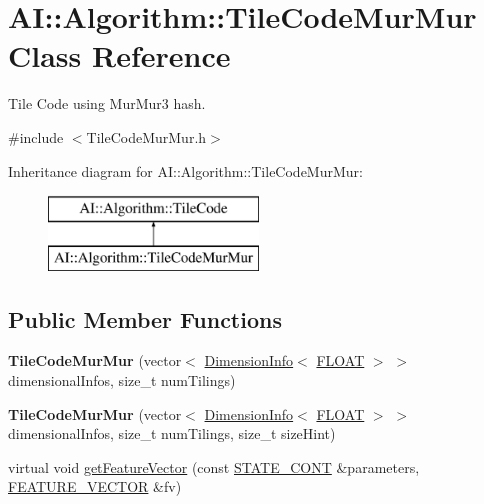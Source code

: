 \hypertarget{classAI_1_1Algorithm_1_1TileCodeMurMur}{\section{A\+I\+:\+:Algorithm\+:\+:Tile\+Code\+Mur\+Mur Class Reference}
\label{classAI_1_1Algorithm_1_1TileCodeMurMur}
}


Tile Code using Mur\+Mur3 hash.  




{\ttfamily \#include $<$Tile\+Code\+Mur\+Mur.\+h$>$}

Inheritance diagram for A\+I\+:\+:Algorithm\+:\+:Tile\+Code\+Mur\+Mur\+:\begin{figure}[H]
\begin{center}
\leavevmode
\includegraphics[height=2.000000cm]{classAI_1_1Algorithm_1_1TileCodeMurMur}
\end{center}
\end{figure}
\subsection*{Public Member Functions}
\begin{DoxyCompactItemize}
\item 
\hypertarget{classAI_1_1Algorithm_1_1TileCodeMurMur_a48746c4faa0e887b4a1fb16aba0cd6d9}{{\bfseries Tile\+Code\+Mur\+Mur} (vector$<$ \hyperlink{classAI_1_1Algorithm_1_1DimensionInfo}{Dimension\+Info}$<$ \hyperlink{namespaceAI_a41b74884a20833db653dded3918e05c3}{F\+L\+O\+A\+T} $>$ $>$ dimensional\+Infos, size\+\_\+t num\+Tilings)}\label{classAI_1_1Algorithm_1_1TileCodeMurMur_a48746c4faa0e887b4a1fb16aba0cd6d9}

\item 
\hypertarget{classAI_1_1Algorithm_1_1TileCodeMurMur_a55c39ff49b9686a90ed6f823986fe4c3}{{\bfseries Tile\+Code\+Mur\+Mur} (vector$<$ \hyperlink{classAI_1_1Algorithm_1_1DimensionInfo}{Dimension\+Info}$<$ \hyperlink{namespaceAI_a41b74884a20833db653dded3918e05c3}{F\+L\+O\+A\+T} $>$ $>$ dimensional\+Infos, size\+\_\+t num\+Tilings, size\+\_\+t size\+Hint)}\label{classAI_1_1Algorithm_1_1TileCodeMurMur_a55c39ff49b9686a90ed6f823986fe4c3}

\item 
virtual void \hyperlink{classAI_1_1Algorithm_1_1TileCodeMurMur_abd19bfe7dd3ddace0cec0ad9a8715392}{get\+Feature\+Vector} (const \hyperlink{namespaceAI_aff63ec21d97dd5f086fddbc3103f5707}{S\+T\+A\+T\+E\+\_\+\+C\+O\+N\+T} \&parameters, \hyperlink{namespaceAI_a23a39e1b301a5c1345fa508796940631}{F\+E\+A\+T\+U\+R\+E\+\_\+\+V\+E\+C\+T\+O\+R} \&fv)
\end{DoxyCompactItemize}
